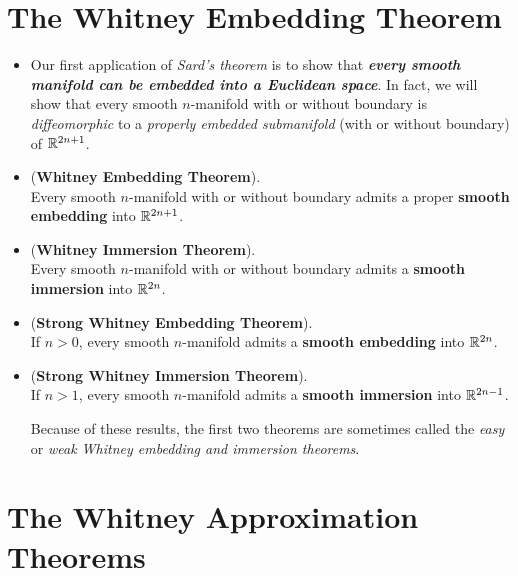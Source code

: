 \documentclass[11pt]{article}
\begin{document}
\section{The Whitney Embedding Theorem}
\begin{itemize}
\item Our first application of \emph{Sard's theorem} is to show that \emph{\textbf{every smooth manifold can be embedded into a Euclidean space}}. In fact, we will show that every smooth $n$-manifold with or without boundary is \emph{diffeomorphic} to a \emph{properly embedded submanifold} (with or without boundary) of ${\mathbb R}^{2n+1}$.

\item \begin{theorem} (\textbf{Whitney Embedding Theorem}).\\
Every smooth $n$-manifold with or without boundary admits a proper \textbf{smooth embedding} into ${\mathbb R}^{2n+1}$.
\end{theorem}


\item \begin{theorem} (\textbf{Whitney Immersion Theorem}). \\
Every smooth $n$-manifold with or without boundary admits a \textbf{smooth immersion} into ${\mathbb R}^{2n}$.
\end{theorem}

\item \begin{theorem}  (\textbf{Strong Whitney Embedding Theorem}). \\
If $n > 0$, every smooth $n$-manifold admits a \textbf{smooth embedding} into ${\mathbb R}^{2n}$.
\end{theorem}

\item \begin{theorem} (\textbf{Strong Whitney Immersion Theorem}). \\
If $n > 1$, every smooth $n$-manifold admits a \textbf{smooth immersion} into ${\mathbb R}^{2n-1}$.
\end{theorem} Because of these results, the first two theorems are sometimes called the \emph{easy} or \emph{weak Whitney embedding and immersion theorems}.
\end{itemize}
\section{The Whitney Approximation Theorems}
\end{document}
